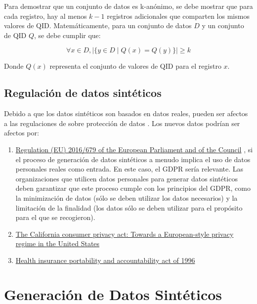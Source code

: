 Para demostrar que un conjunto de datos es k-anónimo, se debe mostrar que para cada registro, hay al menos \( k-1 \) registros adicionales que comparten los mismos valores de QID. Matemáticamente, para un conjunto de datos \( D \) y un conjunto de QID \( Q \), se debe cumplir que:

\begin{equation}
    \forall x \in D, |\{ y \in D \mid Q(x) = Q(y) \}| \geq k
\end{equation}

Donde \( Q(x) \) representa el conjunto de valores de QID para el registro \( x \).


\subsection{Regulación de datos sintéticos}
Debido a que los datos sintéticos son basados en datos reales, pueden ser afectos a las regulaciones de sobre protección de datos \cite{bruce_practical_2020}. Los nuevos datos podrían ser afectos por:
\begin{enumerate}
    \item \href{https://dvbi.ru/Portals/0/DOCUMENTS_SHARE/RISK_MANAGEMENT/EBA/GDPR_eng_rus.pdf}{Regulation (EU) 2016/679 of the European Parliament and of the Council} \cite{regulation_regulation_2016}, si el proceso de generación de datos sintéticos a menudo implica el uso de datos personales reales como entrada. En este caso, el GDPR sería relevante. Las organizaciones que utilicen datos personales para generar datos sintéticos deben garantizar que este proceso cumple con los principios del GDPR, como la minimización de datos (sólo se deben utilizar los datos necesarios) y la limitación de la finalidad (los datos sólo se deben utilizar para el propósito para el que se recogieron).
    \item \href{https://heinonline.org/HOL/LandingPage?handle=hein.journals/jtlp23&div=5&id=&page=}{The California consumer privacy act: Towards a European-style privacy regime in the United States} \cite{pardau_california_2018}
    \item \href{http://www.eolusinc.com/pdf/hipaa.pdf}{Health insurance portability and accountability act of 1996} \cite{act_health_1996}
\end{enumerate}

\section{Generación de Datos Sintéticos}

